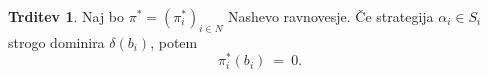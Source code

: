 \documentclass[11pt]{article}
\theoremstyle{definition}
\theoremstyle{definition}
\newtheorem{trditev}{Trditev}[section]
\theoremstyle{definition}
\theoremstyle{definition}
\begin{document}
\begin{trditev}

Naj bo $\pi^* = (\pi_i^*)_{i \in N}$ Nashevo ravnovesje. Če strategija \hbox{$\alpha_i \in S_i$} strogo dominira $\delta(b_i)$, potem 
$$\pi_i^*(b_i) ~=~ 0.$$

\end{trditev}
\vspace{0.5cm}


\pagebreak

\end{document}
